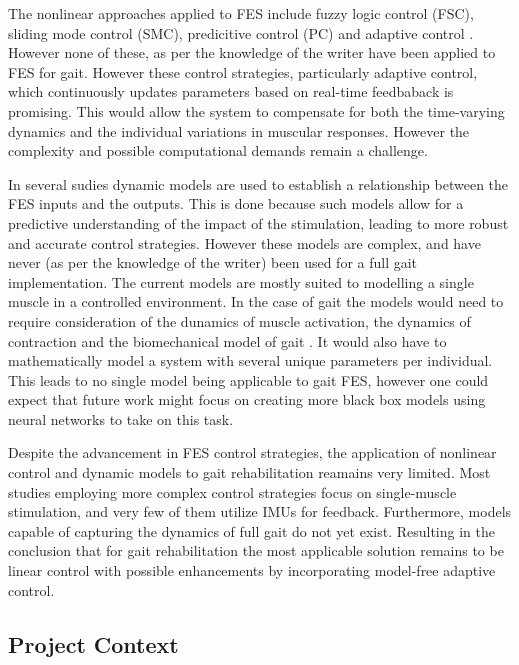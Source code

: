 The nonlinear approaches applied to FES include fuzzy logic control (FSC), sliding mode control (SMC), predicitive control (PC) and adaptive control \cite{chaikho_transcutaneous_2022} . However none of these, as per the knowledge of the writer have been applied to FES for gait. However these control strategies, particularly adaptive control, which continuously updates parameters based on real-time feedbaback is promising. This would allow the system to compensate for both the time-varying dynamics and the individual variations in muscular responses. However the complexity and possible computational demands remain a challenge. 

In several sudies  dynamic models are used to establish a relationship between the FES inputs and the outputs. This is done because such models allow for a predictive understanding of the impact of the stimulation, leading to more robust and accurate control strategies. However these models are complex, and have never (as per the knowledge of the writer) been used for a full gait implementation. The current models  are mostly suited to modelling a single muscle in a controlled environment. In the case of gait the models would need to require consideration of the dunamics of muscle activation, the dynamics of contraction and the biomechanical model of gait \cite{chaikho_transcutaneous_2022}. It would also have to mathematically model a system with several unique parameters per individual. This leads to no single model being applicable to gait FES, however one could expect that future work might focus on creating more black box models using neural networks to take on this task.

Despite the advancement in FES control strategies, the application of nonlinear control and dynamic models to gait rehabilitation reamains very limited. Most studies employing more complex control strategies focus on single-muscle stimulation, and very few of them utilize IMUs for feedback. Furthermore, models capable of capturing the dynamics of full gait do not yet exist. Resulting in the conclusion that for gait rehabilitation the most applicable solution remains to be linear control with possible enhancements by incorporating model-free adaptive control.



\subsection{Project Context}

